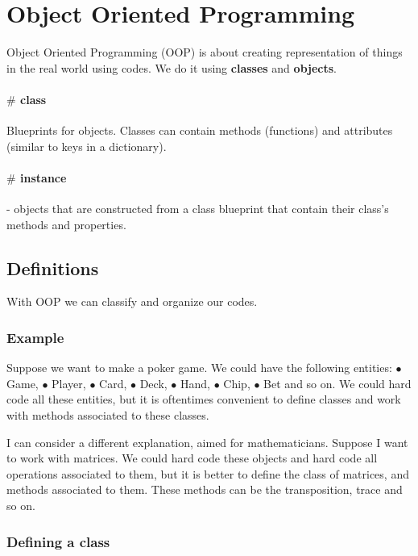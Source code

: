 
\section{Object Oriented Programming}

Object Oriented Programming (OOP) is about creating representation of things in the real world using codes. We do it using {\bf classes} and {\bf objects}.

\paragraph{\(\#\) \bf class} Blueprints for objects. Classes can contain methods (functions) and attributes (similar to keys in a dictionary). 

\paragraph{ \(\#\) \bf instance} - objects that are constructed from a class blueprint that contain their class's methods and properties.

\subsection{Definitions}

With OOP we can classify and organize our codes. 

\subsubsection{Example} Suppose we want to make a poker game. We could have the following entities: \(\bullet\) Game, \(\bullet\) Player, \(\bullet\) Card, \(\bullet\) Deck, \(\bullet\) Hand, \(\bullet\) Chip, \(\bullet\) Bet and so on. We could hard code all these entities, but it is oftentimes convenient to define classes and work with methods associated to these classes. 

I can consider a different explanation, aimed for mathematicians. Suppose I want to work with matrices. We could hard code these objects and hard code all operations associated to them, but it is better to define the class of matrices, and methods associated to them. These methods can be the transposition, trace and so on. 

\subsubsection{Defining a class}

